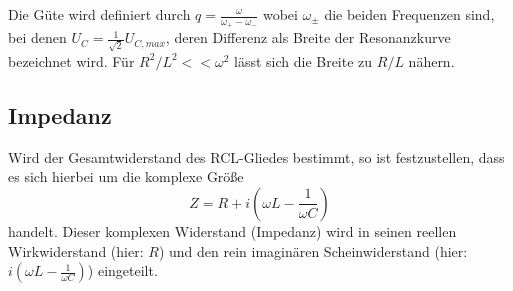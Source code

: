 Die Güte wird definiert durch $q=\frac{\omega}{\omega_+ - \omega_-}$ wobei $\omega_\pm$ die beiden Frequenzen sind,
bei denen $U_C = \frac{1}{\sqrt{2}} U_{C,max}$, deren Differenz als Breite der Resonanzkurve bezeichnet wird.
Für $R^2/L^2 << \omega^2$ lässt sich die Breite zu $R/L$ nähern.

\subsection{Impedanz}
Wird der Gesamtwiderstand des RCL-Gliedes bestimmt, so ist festzustellen, dass es sich hierbei um die komplexe Größe
\begin{equation}
  Z = R + i\left(\omega L - \frac{1}{\omega C}\right)
\end{equation}
handelt. Dieser komplexen Widerstand (Impedanz) wird in seinen reellen Wirkwiderstand (hier: $R$) und den rein imaginären Scheinwiderstand (hier: $i \left(\omega L - \frac{1}{\omega C}\right)$) eingeteilt.
